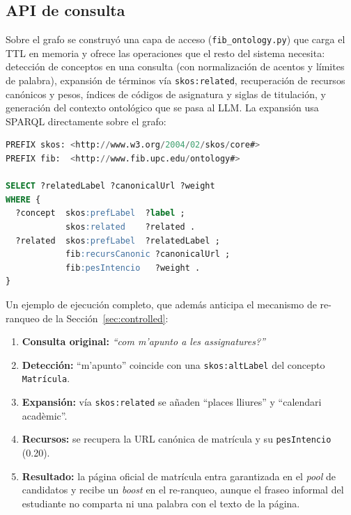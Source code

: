 \documentclass[12pt, a4paper, twoside]{report}
\begin{document}
\subsection{API de consulta}

Sobre el grafo se construy\'o una capa de acceso (\texttt{fib\_ontology.py}) que carga el TTL en memoria y ofrece las operaciones que el resto del sistema necesita: detecci\'on de conceptos en una consulta (con normalizaci\'on de acentos y l\'imites de palabra), expansi\'on de t\'erminos v\'ia \texttt{skos:related}, recuperaci\'on de recursos can\'onicos y pesos, \'indices de c\'odigos de asignatura y siglas de titulaci\'on, y generaci\'on del contexto ontol\'ogico que se pasa al LLM. La expansi\'on usa SPARQL directamente sobre el grafo:

\begin{lstlisting}[language=SQL, caption={Consulta SPARQL de expansi\'on: t\'erminos relacionados de un concepto detectado}, label={lst:sparql_expansion}]
PREFIX skos: <http://www.w3.org/2004/02/skos/core#>
PREFIX fib:  <http://www.fib.upc.edu/ontology#>

SELECT ?relatedLabel ?canonicalUrl ?weight
WHERE {
  ?concept  skos:prefLabel  ?label ;
            skos:related    ?related .
  ?related  skos:prefLabel  ?relatedLabel ;
            fib:recursCanonic ?canonicalUrl ;
            fib:pesIntencio   ?weight .
}
\end{lstlisting}

Un ejemplo de ejecuci\'on completo, que adem\'as anticipa el mecanismo de re-ranqueo de la Secci\'on~\ref{sec:controlled}:

\begin{enumerate}
    \item \textbf{Consulta original:} \textit{``com m'apunto a les assignatures?''}
    \item \textbf{Detecci\'on:} ``m'apunto'' coincide con una \texttt{skos:altLabel} del concepto \texttt{Matr\'icula}.
    \item \textbf{Expansi\'on:} v\'ia \texttt{skos:related} se a\~naden ``places lliures'' y ``calendari acad\`emic''.
    \item \textbf{Recursos:} se recupera la URL can\'onica de matr\'icula y su \texttt{pesIntencio} (0.20).
    \item \textbf{Resultado:} la p\'agina oficial de matr\'icula entra garantizada en el \textit{pool} de candidatos y recibe un \textit{boost} en el re-ranqueo, aunque el fraseo informal del estudiante no comparta ni una palabra con el texto de la p\'agina.
\end{enumerate}
\end{document}
